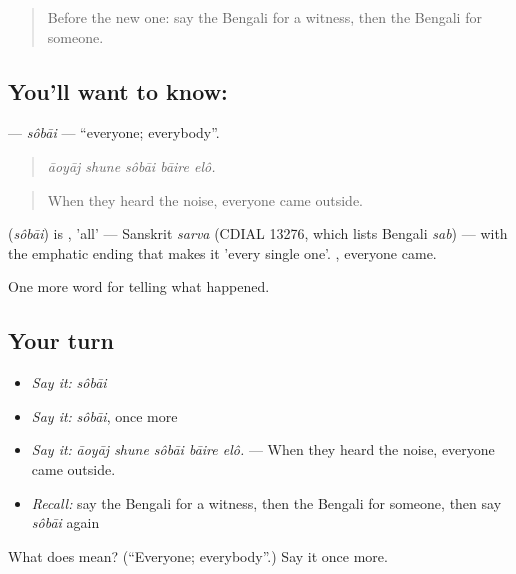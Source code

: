 \begin{quote}
Before the new one: say the Bengali for a witness, then the Bengali for someone.
\end{quote}

\subsection*{You'll want to know: }
\textbf{} — \emph{sôbāi} — \textquotedblleft{}everyone; everybody\textquotedblright{}.

\begin{quote}
    
\end{quote}

\begin{quote}
\emph{āoyāj shune sôbāi bāire elô.}
\end{quote}

\begin{quote}
When they heard the noise, everyone came outside.
\end{quote}

\begin{cousinweb}
\textbf{} (\emph{sôbāi}) is , 'all' — Sanskrit \emph{sarva} (CDIAL 13276, which lists Bengali \emph{sab}) — with the emphatic ending that makes it 'every single one'.  , everyone came.
\end{cousinweb}

\begin{grammarlens}[title={What you've built}]
One more word for telling what happened.
\end{grammarlens}

\subsection*{Your turn}
\begin{itemize}
\raggedright
  \item \emph{Say it:} \emph{sôbāi}
  \item \emph{Say it:} \emph{sôbāi}, once more
  \item \emph{Say it:} \emph{āoyāj shune sôbāi bāire elô.} — When they heard the noise, everyone came outside.
  \item \emph{Recall:} say the Bengali for a witness, then the Bengali for someone, then say \emph{sôbāi} again
\end{itemize}

\begin{tcolorbox}[breakable,colback=teal!4,colframe=teal!35!black,title={Before you move on}]
What does  mean? (\textquotedblleft{}Everyone; everybody\textquotedblright{}.) Say it once more.
\end{tcolorbox}
